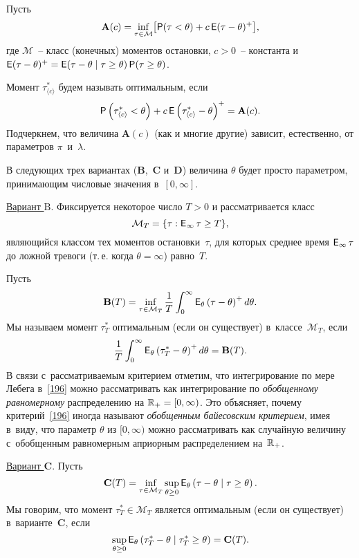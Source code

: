 Пусть
\begin{equation}
\label{193}%
\mathbf{A}(c)
=\inf_{\tau\in\mathcal{M}}
\bigl[\Pr(\tau<\theta)+c\E(\tau-\theta)^+\bigr],
\end{equation}
где $\mathcal{M}$~-- класс (конечных) моментов остановки, $c>0$~--
константа и
$\E(\tau-\theta)^+=\E(\tau-\theta\mid\tau\ge\theta)\Pr(\tau\ge\theta)$.

Момент $\tau^*_{\langle c\rangle}$ будем называть оптимальным,
если
\begin{equation}
\label{194}%
\Pr\left(\tau^*_{\langle c\rangle}<\theta\right)+
c\E\left(\tau^*_{\langle c\rangle}-\theta\right)^+=\mathbf{A}(c).
\end{equation}
Подчеркнем, что величина $\mathbf{A}(c)$ (как и многие другие)
зависит, естественно, от параметров $\pi$~и~$\lambda$.

В следующих трех вариантах ($\mathbf{B}$,~$\mathbf{C}$
и~$\mathbf{D}$) величина $\theta$ будет просто параметром,
принимающим числовые значения в~$[0,\infty]$.

\underline{Вариант $\mathrm{B}$}. Фиксируется некоторое число
$T>0$ и рассматривается класс
\begin{equation}
\label{195}%
\mathcal{M}_T=\{\tau:\E_{\infty}\tau\ge T\},
\end{equation}
являющийся классом тех моментов остановки~$\tau$, для которых
среднее время $\E_{\infty}\tau$ до ложной тревоги (т.\,е. когда
$\theta=\infty$) равно~$T$.

Пусть
\begin{equation}
\label{196}%
\mathbf{B}(T)=\inf_{\tau\in\mathcal{M}_T}\frac{1}{T}\int_0^{\infty}\E_{\theta}
\left(\tau-\theta\right)^+d\theta.
\end{equation}
Мы называем момент $\tau^*_T$ оптимальным (если он существует)
в~классе~$\mathcal{M}_T$, если
\begin{equation}
\label{197}%
\frac{1}{T}\int_0^{\infty}\E_{\theta}
\left(\tau_T^*-\theta\right)^+d\theta=\mathbf{B}(T).
\end{equation}
В связи с~рассматриваемым критерием отметим, что интегрирование по
мере Лебега в~\eqref{196} можно рассматривать как интегрирование
по \textit{обобщенному равномерному} распределению на
$\mathbb{R}_+=[0,\infty)$. Это объясняет, почему критерий~\eqref{196}
иногда называют \textit{обобщенным байесовским критерием}, имея
в~виду, что параметр $\theta$ из $[0,\infty)$ можно рассматривать
как случайную величину с~обобщенным равномерным априорным
распределением на~$\mathbb{R}_+$.

\underline{Вариант $\mathbf{C}$}. Пусть
\begin{equation}
\label{198}%
\mathbf{C}(T)
=\inf_{\tau\in\mathcal{M}_T}\sup_{\theta\ge0}
\E_{\theta}\left(\tau-\theta\mid\tau\ge\theta\right).
\end{equation}
Мы говорим, что момент $\tau_T^*\in\mathcal{M}_T$ является
оптимальным (если он существует) в~варианте~$\mathbf{C}$, если
\begin{equation}
\label{199}%
\sup_{\theta\ge0}
\E_{\theta}\left(\tau_T^*-\theta\mid\tau_T^*\ge\theta\right)
=\mathbf{C}(T).
\end{equation}

